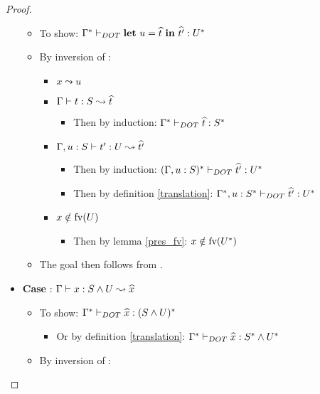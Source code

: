 \begin{proof}
\begin{itemize}
\begin{itemize}
            \item To show:
                $\Gamma^{*} \vdash_{DOT} \textbf{let}\ u = \widehat{t}\ \textbf{in}\ \widehat{t'}: U^{*}$
            \item By inversion of :
            \begin{itemize}
                \item $x \leadsto u$
                \item $\Gamma \vdash t: S \leadsto \widehat{t}$
                \begin{itemize}
                    \item Then by induction:
                        $\Gamma^{*} \vdash_{DOT} \widehat{t}: S^{*}$
                \end{itemize}
                \item $\Gamma, u: S \vdash t': U \leadsto \widehat{t'}$
                \begin{itemize}
                    \item Then by induction:
                        $(\Gamma, u: S)^{*} \vdash_{DOT} \widehat{t'}: U^{*}$
                    \item Then by definition \ref{translation}:
                        $\Gamma^{*}, u: S^{*} \vdash_{DOT} \widehat{t'}: U^{*}$
                \end{itemize}
                \item $x \notin \text{fv}(U)$
                \begin{itemize}
                    \item Then by lemma \ref{pres_fv}: $x \notin \text{fv}(U^{*})$
                \end{itemize}
            \end{itemize}
            \item The goal then follows from .
        \end{itemize}
        \item \textbf{Case} : $\Gamma \vdash x: S \wedge U \leadsto \widehat{x}$
        \begin{itemize}
            \item To show:
                $\Gamma^{*} \vdash_{DOT} \widehat{x}: (S \wedge U)^{*}$
            \begin{itemize}
                \item Or by definition \ref{translation}:
                    $\Gamma^{*} \vdash_{DOT} \widehat{x}: S^{*} \wedge U^{*}$
            \end{itemize}
            \item By inversion of :

\end{itemize}
\end{itemize}
\end{proof}
